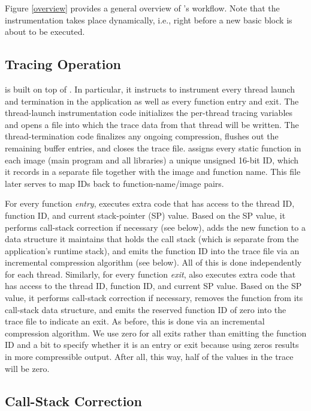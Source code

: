 Figure \ref{overview} provides a general overview of \parlot 's workflow. Note that the instrumentation takes place dynamically, i.e., right before a new basic block is about to be executed.


\subsection{Tracing Operation}

\parlot is built on top of \pin. In particular, it instructs \pin to instrument every thread launch and termination in the application as well as every function entry and exit. The thread-launch instrumentation code initializes the per-thread tracing variables and opens a file into which the trace data from that thread will be written. The thread-termination code finalizes any ongoing compression, flushes out the remaining buffer entries, and closes the trace file. \parlot assigns every static function in each image (main program and all libraries) a unique unsigned 16-bit ID, which it records in a separate file together with the image and function name. This file later serves to map IDs back to function-name/image pairs.

For every function \emph{entry}, \parlot executes extra code that has access to the thread ID, function ID, and current stack-pointer (SP) value. Based on the SP value, it performs call-stack correction if necessary (see below), adds the new function to a data structure it maintains that holds the call stack (which is separate from the application's runtime stack), and emits the function ID into the trace file via an incremental compression algorithm (see below). All of this is done independently for each thread. Similarly, for every function \emph{exit}, \parlot also executes extra code that has access to the thread ID, function ID, and current SP value. Based on the SP value, it performs call-stack correction if necessary, removes the function from its call-stack data structure, and emits the reserved function ID of zero into the trace file to indicate an exit. As before, this is done via an incremental compression algorithm. We use zero for all exits rather than emitting the function ID and a bit to specify whether it is an entry or exit because using zeros results in more compressible output. After all, this way, half of the values in the trace will be zero.


\subsection{Call-Stack Correction}

